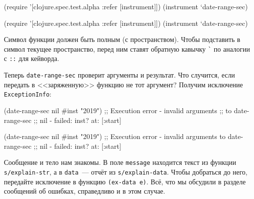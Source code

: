\begin{english}
  \begin{clojure}
(require '[clojure.spec.test.alpha
           :refer [instrument]])
(instrument `date-range-sec)
  \end{clojure}
\end{english}

\else

\begin{english}
  \begin{clojure}
(require '[clojure.spec.test.alpha :refer [instrument]])
(instrument `date-range-sec)
  \end{clojure}
\end{english}

\fi


Символ функции должен быть полным (с пространством). Чтобы подставить в символ
текущее пространство, перед ним ставят обратную кавычку \verb|`| по аналогии с
\verb|::| для кейворда.

Теперь \verb|date-range-sec| проверит аргументы и результат. Что случится,
если передать в <<заряженную>> функцию не тот аргумент? Получим исключение
\verb|ExceptionInfo|:

\ifx\DEVICETYPE\MOBILE

\begin{english}
  \begin{clojure}
(date-range-sec nil #inst "2019")
;; Execution error - invalid arguments
;; to date-range-sec
;; nil - failed: inst? at: [:start]
  \end{clojure}
\end{english}

\else

\begin{english}
  \begin{clojure}
(date-range-sec nil #inst "2019")
;; Execution error - invalid arguments to date-range-sec
;; nil - failed: inst? at: [:start]
  \end{clojure}
\end{english}

\fi


Сообщение и тело нам знакомы. В поле \verb|message| находится текст из функции
\verb|s/explain-str|, а в \verb|data|~--- отчёт из \verb|s/explain-data|. Чтобы
добраться до него, передайте исключение в функцию \verb|(ex-data e)|. Всё, что
мы обсудили в разделе сообщений об ошибках, справедливо и в этом случае.

